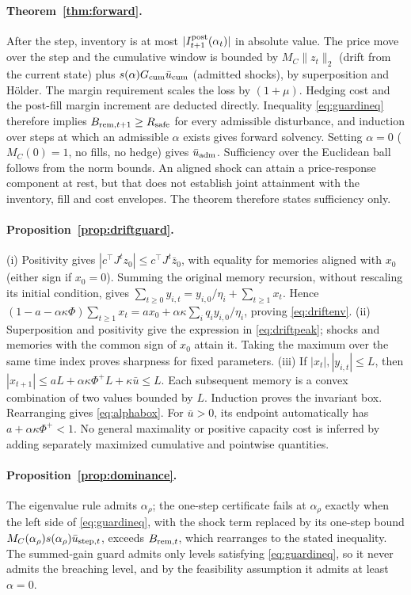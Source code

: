 \paragraph{Theorem~\ref{thm:forward}.} After the step, inventory is at most $|I^{\rm post}_{t+1}(\alpha_t)|$ in absolute value. The price move over the step and the cumulative window is bounded by $M_C\|z_t\|_2$ (drift from the current state) plus $s(\alpha)G_{\rm cum}\bar u_{\rm cum}$ (admitted shocks), by superposition and H\"older. The margin requirement scales the loss by $(1+\mu)$. Hedging cost and the post-fill margin increment are deducted directly. Inequality \eqref{eq:guardineq} therefore implies $B_{{\rm rem},t+1}\ge R_{\rm safe}$ for every admissible disturbance, and induction over steps at which an admissible $\alpha$ exists gives forward solvency. Setting $\alpha=0$ ($M_C(0)=1$, no fills, no hedge) gives $\bar u_{\rm adm}$. Sufficiency over the Euclidean ball follows from the norm bounds. An aligned shock can attain a price-response component at rest, but that does not establish joint attainment with the inventory, fill and cost envelopes. The theorem therefore states sufficiency only.

\paragraph{Proposition~\ref{prop:driftguard}.} (i) Positivity gives $|c^\top J^tz_0|\le c^\top J^t\bar z_0$, with equality for memories aligned with $x_0$ (either sign if $x_0=0$). Summing the original memory recursion, without rescaling its initial condition, gives $\sum_{t\ge0}y_{i,t}=y_{i,0}/\eta_i+\sum_{t\ge1}x_t$. Hence $(1-a-\alpha\kappa\Phi)\sum_{t\ge1}x_t=ax_0+\alpha\kappa\sum_iq_iy_{i,0}/\eta_i$, proving \eqref{eq:driftenv}. (ii) Superposition and positivity give the expression in \eqref{eq:driftpeak}; shocks and memories with the common sign of $x_0$ attain it. Taking the maximum over the same time index proves sharpness for fixed parameters. (iii) If $|x_t|,|y_{i,t}|\le L$, then $|x_{t+1}|\le aL+\alpha\kappa\Phi^+L+\kappa\bar u\le L$. Each subsequent memory is a convex combination of two values bounded by $L$. Induction proves the invariant box. Rearranging gives \eqref{eq:alphabox}. For $\bar u>0$, its endpoint automatically has $a+\alpha\kappa\Phi^+<1$. No general maximality or positive capacity cost is inferred by adding separately maximized cumulative and pointwise quantities.

\paragraph{Proposition~\ref{prop:dominance}.} The eigenvalue rule admits $\alpha_\rho$; the one-step certificate fails at $\alpha_\rho$ exactly when the left side of \eqref{eq:guardineq}, with the shock term replaced by its one-step bound $M_C(\alpha_\rho)s(\alpha_\rho)\bar u_{{\rm step},t}$, exceeds $B_{{\rm rem},t}$, which rearranges to the stated inequality. The summed-gain guard admits only levels satisfying \eqref{eq:guardineq}, so it never admits the breaching level, and by the feasibility assumption it admits at least $\alpha=0$.

